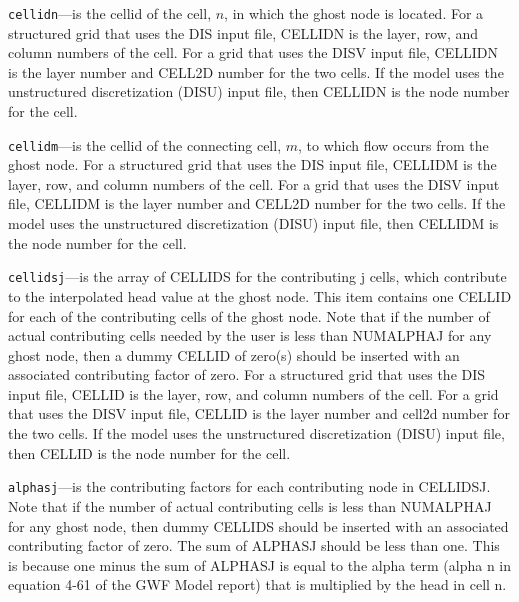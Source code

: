 \begin{description}
\item \texttt{cellidn}---is the cellid of the cell, $n$, in which the ghost node is located. For a structured grid that uses the DIS input file, CELLIDN is the layer, row, and column numbers of the cell.   For a grid that uses the DISV input file, CELLIDN is the layer number and CELL2D number for the two cells.  If the model uses the unstructured discretization (DISU) input file, then CELLIDN is the node number for the cell.

\item \texttt{cellidm}---is the cellid of the connecting cell, $m$, to which flow occurs from the ghost node. For a structured grid that uses the DIS input file, CELLIDM is the layer, row, and column numbers of the cell.   For a grid that uses the DISV input file, CELLIDM is the layer number and CELL2D number for the two cells.  If the model uses the unstructured discretization (DISU) input file, then CELLIDM is the node number for the cell.

\item \texttt{cellidsj}---is the array of CELLIDS for the contributing j cells, which contribute to the interpolated head value at the ghost node. This item contains one CELLID for each of the contributing cells of the ghost node. Note that if the number of actual contributing cells needed by the user is less than NUMALPHAJ for any ghost node, then a dummy CELLID of zero(s) should be inserted with an associated contributing factor of zero. For a structured grid that uses the DIS input file, CELLID is the layer, row, and column numbers of the cell.   For a grid that uses the DISV input file, CELLID is the layer number and cell2d number for the two cells.  If the model uses the unstructured discretization (DISU) input file, then CELLID is the node number for the cell.

\item \texttt{alphasj}---is the contributing factors for each contributing node in CELLIDSJ. Note that if the number of actual contributing cells is less than NUMALPHAJ for any ghost node, then dummy CELLIDS should be inserted with an associated contributing factor of zero.  The sum of ALPHASJ should be less than one.  This is because one minus the sum of ALPHASJ is equal to the alpha term (alpha n in equation 4-61 of the GWF Model report) that is multiplied by the head in cell n.

\end{description}

